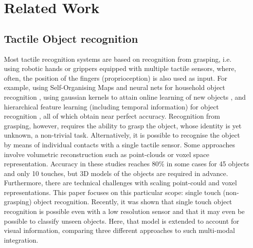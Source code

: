 \documentclass[9pt,technote]{IEEEtran}  %
\begin{document}
\section{Related Work}
\subsection{Tactile Object recognition}
Most tactile recognition systems are based on recognition from grasping, i.e. using robotic hands or grippers equipped with multiple tactile sensors, where, often, the position of the fingers (proprioception) is also used as input. For example, using Self-Organising Maps and neural nets for household object recognition \cite{Navarro2012}, using gaussian kernels to attain online learning of new objects \cite{Soh2012}, and hierarchical feature learning (including temporal information) for object recognition \cite{Madry2014}, all of which obtain near perfect accuracy.
Recognition from grasping, however, requires the ability to grasp the object, whose identity is yet unknown, a non-trivial task. Alternatively, it is possible to recognise the object by means of individual contacts with a single tactile sensor. Some approaches involve volumetric reconstruction \cite{Gorges2010a,Aggarwal2015} such as point-clouds or voxel space representation. Accuracy in these studies reaches 80\% in some cases for 45 objects and only 10 touches, but 3D models of the objects are required in advance. Furthermore, there are technical challenges with scaling point-could and voxel representations. This paper focuses on this particular scope: single touch (non-grasping) object recognition. Recently, it was shown that single touch object recognition is possible even with a low resolution sensor \cite{Corradi2015} and that it may even be possible to classify unseen objects. Here, that model is extended to account for visual information, comparing three different approaches to such multi-modal integration.
\end{document}

